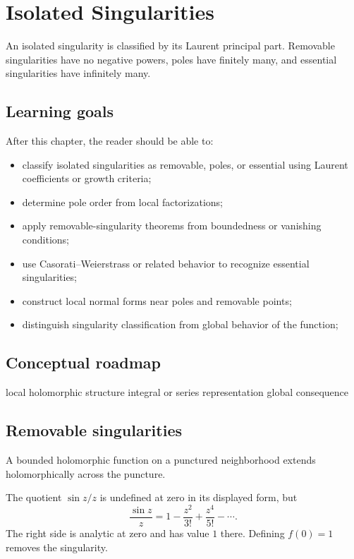 \chapter{Isolated Singularities}
\label{ch:iv09}

An isolated singularity is classified by its Laurent principal part. Removable singularities have no negative powers, poles have finitely many, and essential singularities have infinitely many.

\section*{Learning goals}
After this chapter, the reader should be able to:
\begin{itemize}
\item classify isolated singularities as removable, poles, or essential using Laurent coefficients or growth criteria;
\item determine pole order from local factorizations;
\item apply removable-singularity theorems from boundedness or vanishing conditions;
\item use Casorati--Weierstrass or related behavior to recognize essential singularities;
\item construct local normal forms near poles and removable points;
\item distinguish singularity classification from global behavior of the function;
\end{itemize}
\section*{Conceptual roadmap}
\volroadmap
  {local holomorphic structure}
  {integral or series representation}
  {global consequence}

\section{Removable singularities}
A bounded holomorphic function on a punctured neighborhood extends holomorphically across the puncture.

\begin{example}\label{ex:iv09-expand-01}
The quotient \(\sin z/z\) is undefined at zero in its displayed form, but
\[
\frac{\sin z}{z}=1-\frac{z^2}{3!}+\frac{z^4}{5!}-\cdots.
\]
The right side is analytic at zero and has value \(1\) there. Defining \(f(0)=1\) removes the singularity.
\end{example}
